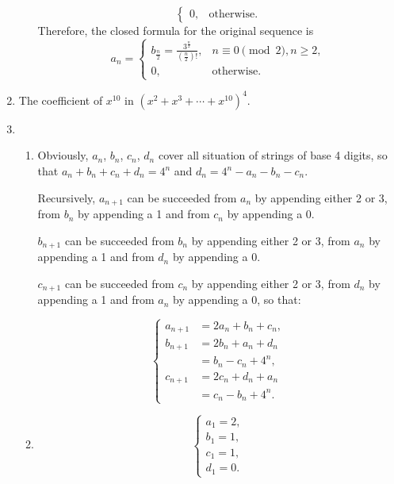 \documentclass{../../cls/sig-alternate-05-2015}
\begin{document}
\begin{enumerate}
\begin{enumerate}
\begin{equation}
\begin{cases}
            0, & \text{otherwise}.
            \end{cases}
        \end{equation}
        Therefore, the closed formula for the original sequence is
        \begin{equation}
            a_n = \begin{cases}
                b_{\frac{n}{2}} = \frac{3^{\frac{n}{2}}}{(\frac{n}{2})!}, & n \equiv 0 \pmod{2}, n \ge 2,\\
                0, & \text{otherwise}.
            \end{cases}
        \end{equation}
    \end{enumerate}
    \item The coefficient of $x^{10}$ in $(x^2+x^3+\cdots +x^{10})^4$.
    \item \begin{enumerate}
        \item Obviously, $a_n$, $b_n$, $c_n$, $d_n$ cover all situation of strings of base 4 digits, so that $a_n + b_n + c_n + d_n = 4^n$ and $d_n = 4^n - a_n - b_n - c_n$.
        
        Recursively, $a_{n + 1}$ can be succeeded from $a_n$ by appending either 2 or 3, from $b_n$ by appending a 1 and from $c_n$ by appending a 0.
        
        $b_{n + 1}$ can be succeeded from $b_n$ by appending either 2 or 3, from $a_n$ by appending a 1 and from $d_n$ by appending a 0.
        
        $c_{n + 1}$ can be succeeded from $c_n$ by appending either 2 or 3, from $d_n$ by appending a 1 and from $a_n$ by appending a 0, so that:
        
        \begin{equation}
            \begin{cases}
            a_{n+1} & = 2a_n + b_n + c_n,\\
            b_{n+1} & = 2b_n + a_n + d_n\\
            & = b_n - c_n + 4^n,\\
            c_{n+1} & = 2c_n + d_n + a_n\\
            & = c_n - b_n + 4^n.
            \end{cases}
        \end{equation}
        
        \item \begin{equation}
            \begin{cases}
            a_1 = 2,\\
            b_1 = 1,\\
            c_1 = 1,\\
            d_1 = 0.
            \end{cases}
        \end{equation}
        

\end{enumerate}
\end{enumerate}
\end{document}
